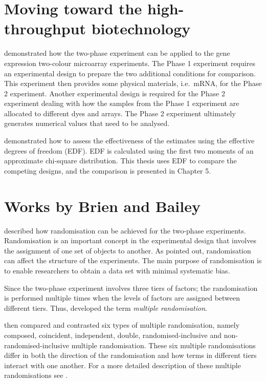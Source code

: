 \documentclass[11pt,a4paper]{article}
\begin{document}
\section{Moving toward the high-throughput biotechnology}
\cite{Jarrett2008} demonstrated how the two-phase experiment can be applied to the gene expression two-colour microarray experiments. The Phase 1 experiment requires an experimental design to prepare the two additional conditions for comparison. This experiment then provides some physical materials, i.e.\ mRNA, for the Phase 2 experiment. Another experimental design is required for the Phase 2 experiment dealing with how the samples from the Phase 1 experiment are allocated to different dyes and arrays. The Phase 2 experiment ultimately generates numerical values that need to be analysed. 

\cite{Jarrett2008} demonstrated how to assess the effectiveness of the estimates using the effective degrees of freedom (EDF). EDF is calculated using the first two moments of an approximate chi-square distribution. This thesis uses EDF to compare the competing designs, and the comparison is presented in Chapter 5.

\section{Works by Brien and Bailey} 
\cite{Brien2006b} described how randomisation can be achieved for the two-phase experiments. Randomisation is an important concept in the experimental design that involves the assignment of one set of objects to another. As \cite{Brien1983} pointed out, randomisation can affect the structure of the experiments. The main purpose of randomisation is to enable researchers to obtain a data set with minimal systematic bias. 

Since the two-phase experiment involves three tiers of factors; the randomisation is performed multiple times when the levels of factors are assigned between different tiers. Thus, \cite{Brien2006b} developed the term \emph{multiple randomisation}. 

\cite{Brien2006b} then compared and contrasted six types of multiple randomisation, namely composed, coincident, independent, double, randomised-inclusive and non-randomised-inclusive multiple randomisation. These six multiple randomisations differ in both the direction of the randomisation and how terms in different tiers interact with one another. For a more detailed description of these multiple randomisations see \cite{Brien2006b}.  
\end{document}
